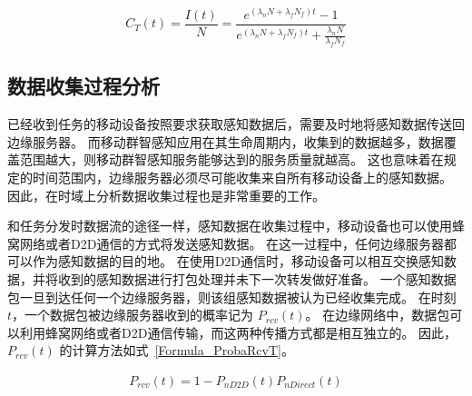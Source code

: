 \begin{equation}
  \label{Formula_Coverage_of_Task}
  C_T(t) = \frac{I(t)}{N} = \frac{e^{(\lambda_n N + \lambda_f N_f) t} - 1}{e^{(\lambda_n N + \lambda_f N_f) t} + \frac{\lambda_n N}{\lambda_f N_f}}
\end{equation}

\subsection{数据收集过程分析}

已经收到任务的移动设备按照要求获取感知数据后，需要及时地将感知数据传送回边缘服务器。
而移动群智感知应用在其生命周期内，收集到的数据越多，数据覆盖范围越大，则移动群智感知服务能够达到的服务质量就越高。
这也意味着在规定的时间范围内，边缘服务器必须尽可能收集来自所有移动设备上的感知数据。
因此，在时域上分析数据收集过程也是非常重要的工作。


和任务分发时数据流的途径一样，感知数据在收集过程中，移动设备也可以使用蜂窝网络或者D2D通信的方式将发送感知数据。
在这一过程中，任何边缘服务器都可以作为感知数据的目的地。
在使用D2D通信时，移动设备可以相互交换感知数据，并将收到的感知数据进行打包处理并未下一次转发做好准备。
一个感知数据包一旦到达任何一个边缘服务器，则该组感知数据被认为已经收集完成。
在时刻 $t$，一个数据包被边缘服务器收到的概率记为 $P_{rcv}(t)$。
在边缘网络中，数据包可以利用蜂窝网络或者D2D通信传输，而这两种传播方式都是相互独立的。
因此，$P_{rcv}(t)$ 的计算方法如式~\eqref{Formula_ProbaRcvT}。

\begin{equation}
\label{Formula_ProbaRcvT}
\begin{aligned}
P_{rcv}(t) = 1 - P_{nD2D}(t) P_{nDirect}(t)
\end{aligned}
\end{equation}

